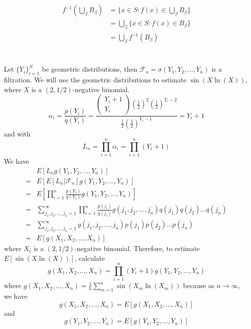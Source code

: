 \documentclass[11pt]{article}
\begin{document}
\subsection{}
\begin{equation*}
    \begin{aligned}
        f^{-1} \left(\bigcup_\beta B_\beta \right) &= \{x \in S: f(x) \in \bigcup_\beta B_\beta \} \\
        &= \bigcup_\beta \{x \in S: f(x) \in B_\beta\} \\
        &= \bigcup_\beta f^{-1}(B_\beta) 
    \end{aligned}
\end{equation*}
\newpage
\section{}
Let $\{Y_i\}_{i=1}^N$ be geometric distributions, then $\mathcal{F}_n = \sigma(Y_1, Y_2, \hdots, Y_n)$ is a filtration. We will use the geometric distributions to estimate $\sin(X \ln(X))$, 
where $X$ is a $(2,1/2)$-negative binomial.  
\[
    \alpha_i = \frac{p(Y_i)}{q(Y_i)} = \frac{\begin{pmatrix} Y_i+1 \\ Y_i \end{pmatrix} \left(\frac{1}{2}\right)^2 \left( \frac{1}{2}\right)^{Y_i-2}}{\frac{1}{2} \left( \frac{1}{2}\right)^{Y_i-1}} = Y_i + 1
\]
and with
\[
    L_n = \prod_{i=1}^n \alpha_i = \prod_{i=1}^n (Y_i + 1)
\]
We have
\begin{equation*}
    \begin{aligned}
        &E[L_n g(Y_1,Y_2, \hdots, Y_n)] \\
        =& E[ E[L_n | \mathcal{F}_n] g(Y_1, Y_2, \hdots, Y_n)] \\
        =& E\left[\prod_{i=1}^n \frac{p(Y_i)}{q(Y_i)} g(Y_1,Y_2, \hdots, Y_n) \right] \\
        =& \sum_{j_1, j_2, \hdots, j_n = 1}^\infty \prod_{i=1}^n \frac{p(j_i)}{q(j_i)} g(j_1, j_2, \hdots, j_n) q(j_1) q(j_2) \hdots q(j_n) \\
        =& \sum_{j_1, j_2, \hdots, j_n = 1}^\infty g(j_1, j_2, \hdots, j_n) p(j_1)p(j_2)\hdots p(j_n) \\
        =& E[g(X_1, X_2, \hdots, X_n)]
    \end{aligned}
\end{equation*}
where $X_i$ is a $(2,1/2)$-negative binomial.
Therefore, to estimate $E[\sin(X\ln(X))]$, calculate
\[
    g(X_1, X_2, \hdots, X_n) = \prod_{i=1}^n (Y_i+1) g(Y_1, Y_2, \hdots, Y_n)
\]
where $g(X_1, X_2, \hdots, X_n) = \frac{1}{n} \sum_{m=1}^n \sin(X_m \ln(X_m))$ because as $n \to \infty$, we have
\[
    g(X_1, X_2, \hdots, X_n) = E[g(X_1, X_2, \hdots, X_n)]
\]
and 
\[
    g(Y_1, Y_2, \hdots, Y_n) = E[g(Y_1, Y_2, \hdots, Y_n)]
\]
\end{document}
